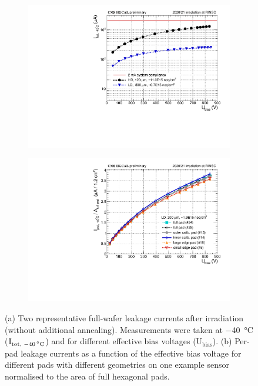 \begin{figure}
	\captionsetup[subfigure]{aboveskip=-1pt,belowskip=-1pt}
	\centering
	\begin{subfigure}[b]{0.49\textwidth}
		\includegraphics[width=0.999\textwidth]{plots/total_iv/total_current_IV.pdf}
		\subcaption{
		}
		\label{plot:tot_IV_good}
    \end{subfigure}
    \hfill
    \begin{subfigure}[b]{0.49\textwidth}
        \includegraphics[width=0.999\textwidth]{plots/channel_iv/channel_IV_sensors_channels.pdf}
        \subcaption{
        }
        \label{plot:pad_IV_channels}
    \end{subfigure}

	\caption{
		(a) Two representative full-wafer leakage currents after irradiation (without additional annealing). Measurements were taken at \SI{-40}{\celsius} ($\text{I}_\text{tot, \SI{-40}{\celsius}}$) and for different effective bias voltages ($\text{U}_\text{bias}$). 
        (b) Per-pad leakage currents as a function of the effective bias voltage for different pads with different geometries on one example sensor normalised to the area of full hexagonal pads.
	}
\end{figure}


